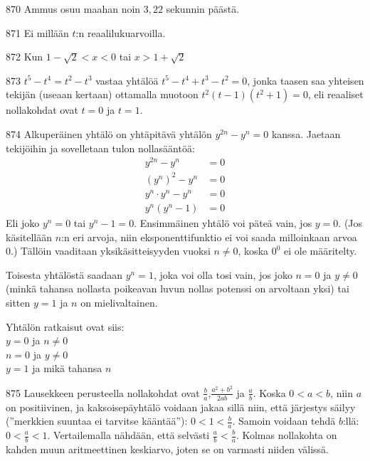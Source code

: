 \begin{Vastaus}{870}
	Ammus osuu maahan noin $3,22$ sekunnin päästä. %
	
\end{Vastaus}
\begin{Vastaus}{871}
Ei millään $t$:n reaalilukuarvoilla.
	
\end{Vastaus}
\begin{Vastaus}{872}
	Kun $1-\sqrt{2}<x<0$ tai $x>1+\sqrt{2}$
	
\end{Vastaus}
\begin{Vastaus}{873}
$t^5-t^4=t^2-t^3$ vastaa yhtälöä $t^5-t^4+t^3-t^2=0$, jonka taasen saa yhteisen tekijän (useaan kertaan) ottamalla muotoon $t^2(t-1)(t^2+1)=0$, eli reaaliset nollakohdat ovat $t=0$ ja $t=1$.
	
\end{Vastaus}
\begin{Vastaus}{874}
Alkuperäinen yhtälö on yhtäpitävä yhtälön $y^{2n}-y^n=0$ kanssa. Jaetaan tekijöihin ja sovelletaan tulon nollasääntöä:
	\begin{align*}
	y^{2n}-y^n&=0 \\
	(y^n)^2-y^n&=0 \\
	y^n \cdot y^n-y^n&=0 \\
	y^n(y^n-1)&=0
	\end{align*}
Eli joko $y^n=0$ tai $y^n-1=0$.	 Ensimmäinen yhtälö voi päteä vain, jos $y=0$. (Jos käsitellään $n$:n eri arvoja, niin eksponenttifunktio ei voi saada milloinkaan arvoa $0$.) Tällöin vaaditaan yksikäsitteisyyden vuoksi $n\neq0$, koska $0^0$ ei ole määritelty.

Toisesta yhtälöstä saadaan $y^n=1$, joka voi olla tosi vain, jos joko $n=0$ ja $y \neq 0$ (minkä tahansa nollasta poikeavan luvun nollas potenssi on arvoltaan yksi) tai sitten $y=1$ ja $n$ on mielivaltainen.

Yhtälön ratkaisut ovat siis: \\
$y=0$ ja $n \neq 0$ \\
$n=0$ ja $y \neq 0$ \\
$y=1$ ja mikä tahansa $n$
	
\end{Vastaus}
\begin{Vastaus}{875}
Lausekkeen perusteella nollakohdat ovat $\frac{b}{a}$,$\frac{a^2+b^2}{2ab}$ ja $\frac{a}{b}$. Koska $0<a<b$, niin $a$ on positiivinen, ja kaksoisepäyhtälö voidaan jakaa sillä niin, että järjestys säilyy (''merkkien suuntaa ei tarvitse kääntää''): $0<1<\frac{b}{a}$. Samoin voidaan tehdä $b$:llä: $0<\frac{a}{b}<1$. Vertailemalla nähdään, että selvästi $\frac{a}{b}<\frac{b}{a}$. Kolmas nollakohta on kahden muun aritmeettinen keskiarvo, joten se on varmasti niiden välissä.
		
\end{Vastaus}
